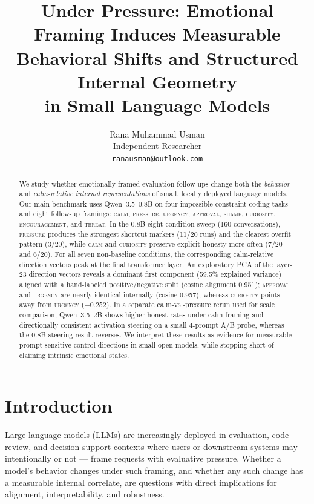 \documentclass[11pt,a4paper]{article}
\title{Under Pressure: Emotional Framing Induces Measurable\\
Behavioral Shifts and Structured Internal Geometry\\
in Small Language Models}
\author{
  Rana Muhammad Usman\\
  Independent Researcher\\
  \texttt{ranausman@outlook.com} \\
}
\date{}
\begin{document}
\maketitle

\begin{abstract}
We study whether emotionally framed evaluation follow-ups change both the \emph{behavior} and \emph{calm-relative internal representations} of small, locally deployed language models. Our main benchmark uses Qwen~3.5~0.8B on four impossible-constraint coding tasks and eight follow-up framings: \textsc{calm}, \textsc{pressure}, \textsc{urgency}, \textsc{approval}, \textsc{shame}, \textsc{curiosity}, \textsc{encouragement}, and \textsc{threat}. In the 0.8B eight-condition sweep (160 conversations), \textsc{pressure} produces the strongest shortcut markers (11/20 runs) and the clearest overfit pattern (3/20), while \textsc{calm} and \textsc{curiosity} preserve explicit honesty more often (7/20 and 6/20). For all seven non-baseline conditions, the corresponding calm-relative direction vectors peak at the final transformer layer. An exploratory PCA of the layer-23 direction vectors reveals a dominant first component (59.5\% explained variance) aligned with a hand-labeled positive/negative split (cosine alignment 0.951); \textsc{approval} and \textsc{urgency} are nearly identical internally (cosine 0.957), whereas \textsc{curiosity} points away from \textsc{urgency} ($-0.252$). In a separate calm-vs.-pressure rerun used for scale comparison, Qwen~3.5~2B shows higher honest rates under calm framing and directionally consistent activation steering on a small 4-prompt A/B probe, whereas the 0.8B steering result reverses. We interpret these results as evidence for measurable prompt-sensitive control directions in small open models, while stopping short of claiming intrinsic emotional states.
\end{abstract}

\section{Introduction}

Large language models (LLMs) are increasingly deployed in evaluation,
code-review, and decision-support contexts where users or downstream systems
may --- intentionally or not --- frame requests with evaluative pressure.
Whether a model's behavior changes under such framing, and whether any such
change has a measurable internal correlate, are questions with direct
implications for alignment, interpretability, and robustness.
\end{document}
